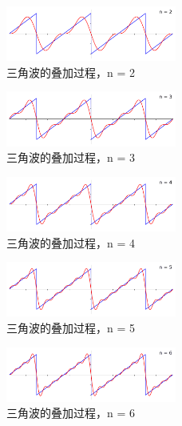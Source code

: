 \documentclass[lang=cn,newtx,10pt,scheme=chinese]{elegantbook}
\begin{document}
\begin{figure}[!htb]
\centering
\includegraphics[width=0.5\textwidth]{fourier_series_triangle-1.png}
\caption{三角波的叠加过程，n = 2}
\end{figure}

\begin{figure}[!htb]
\centering
\includegraphics[width=0.5\textwidth]{fourier_series_triangle-2.png}
\caption{三角波的叠加过程，n = 3}
\end{figure}

\begin{figure}[!htb]
\centering
\includegraphics[width=0.5\textwidth]{fourier_series_triangle-3.png}
\caption{三角波的叠加过程，n = 4}
\end{figure}

\begin{figure}[!htb]
\centering
\includegraphics[width=0.5\textwidth]{fourier_series_triangle-4.png}
\caption{三角波的叠加过程，n = 5}
\end{figure}

\begin{figure}[!htb]
\centering
\includegraphics[width=0.5\textwidth]{fourier_series_triangle-5.png}
\caption{三角波的叠加过程，n = 6}
\end{figure}
\end{document}
